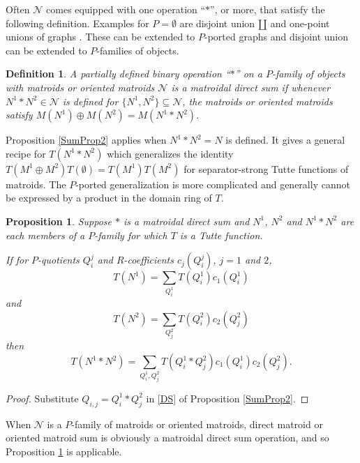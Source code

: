 \documentclass[12pt,leqno]{amsart}
\newtheorem{prop}[lem]{Proposition}
\newtheorem{definition}[lem]{Definition}
\theoremstyle{remark}
\begin{document}
Often
$\mathcal{N}$ comes equipped with one 
operation ``$*$'', or more, that satisfy
the following definition.  
Examples for $P=\emptyset$ are disjoint union $\amalg$
and one-point unions of graphs \cite{Ellis-Monaghan-Traldi}.
These can be extended to $P$-ported graphs 
and disjoint union can be extended to $P$-families of 
objects.

\begin{definition}
A partially defined binary operation ``$*$'' on
a $P$-family of objects with matroids or oriented matroids
$\mathcal{N}$ is \emph{a matroidal direct sum} if 
whenever $N^1*N^2\in\mathcal{N}$ is defined for
$\{N^1,N^2\}\subseteq\mathcal{N}$, the 
matroids or oriented matroids satisfy
$M(N^1)\oplus M(N^2) = M(N^1*N^2)$.
\end{definition}

Proposition \ref{SumProp2} applies
when $N^1*N^2=N$ is defined.
It gives a general recipe for $T(N^1*N^2)$ which generalizes
the identity \cite{Ellis-Monaghan-Traldi}
$T(M^1\oplus M^2)T(\emptyset)=T(M^1)T(M^2)$ 
for separator-strong Tutte functions of
matroids.
The $P$-ported generalization is more complicated and generally cannot
be expressed by a product in the domain ring of $T$.  

\begin{prop}
\label{SumProp}
Suppose $*$ is a matroidal direct sum and
$N^1$, $N^2$ and $N^1*N^2$ are each members of a $P$-family
for which $T$ is a Tutte function.

If for $P$-quotients $Q^j_i$ and $R$-coefficients $c_j(Q^j_i)$, $j=1$ and $2$,
\begin{equation}
\label{MD1}
\tag{MD1}
T(N^1) = \sum_{Q^1_i}T(Q^1_{i})c_1(Q^1_{i})
\end{equation}
and
\begin{equation}
\label{MD2}
\tag{MD2}
T(N^2) = \sum_{Q^2_j}T(Q^2_{i})c_2(Q^2_{j})
\end{equation}
then
\begin{equation}
\label{MD}
\tag{MD}
T(N^1 * N^2) = \sum_{Q^1_i,Q^2_j}T(Q^1_{i}*Q^2_{j})c_1(Q^1_{i})c_2(Q^2_{j}).
\end{equation}
\end{prop}

\begin{proof}
Substitute $Q_{i,j}=Q^1_i*Q^2_j$ in \eqref{DS} of Proposition \ref{SumProp2}.
\end{proof}


When $\mathcal{N}$ is a $P$-family of matroids or oriented matroids,
direct matroid or oriented matroid sum is obviously a matroidal direct
sum operation, and so Proposition \ref{SumProp} is applicable.
\end{document}
